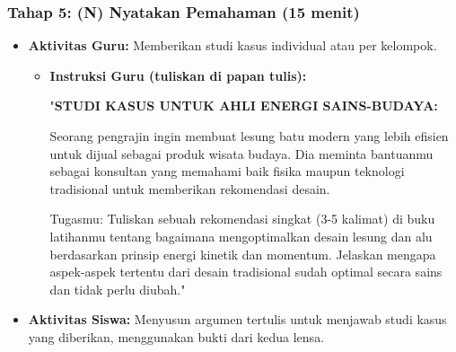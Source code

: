 \documentclass[a4paper,12pt]{article}
\begin{document}
\subsubsection{Tahap 5: (N) Nyatakan Pemahaman (15 menit)}
\begin{itemize}
\item \textbf{Aktivitas Guru:} Memberikan studi kasus individual atau per kelompok.
    \begin{itemize}
    \item \textbf{Instruksi Guru (tuliskan di papan tulis):}
    
    "\textbf{STUDI KASUS UNTUK AHLI ENERGI SAINS-BUDAYA:}
    
    Seorang pengrajin ingin membuat lesung batu modern yang lebih efisien untuk dijual sebagai produk wisata budaya. Dia meminta bantuanmu sebagai konsultan yang memahami baik fisika maupun teknologi tradisional untuk memberikan rekomendasi desain.
    
    Tugasmu: Tuliskan sebuah rekomendasi singkat (3-5 kalimat) di buku latihanmu tentang bagaimana mengoptimalkan desain lesung dan alu berdasarkan prinsip energi kinetik dan momentum. Jelaskan mengapa aspek-aspek tertentu dari desain tradisional sudah optimal secara sains dan tidak perlu diubah."
    \end{itemize}
\item \textbf{Aktivitas Siswa:} Menyusun argumen tertulis untuk menjawab studi kasus yang diberikan, menggunakan bukti dari kedua lensa.
\end{itemize}
\end{document}
